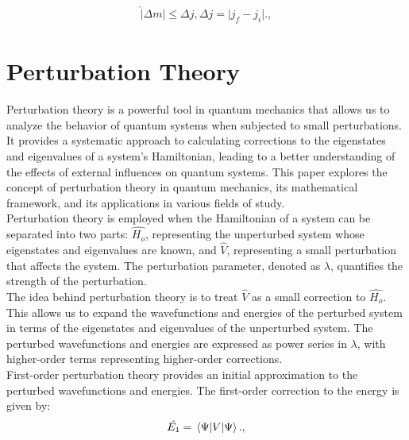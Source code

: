\documentclass[a4paper,11pt]{article}
\begin{document}
\begin{equation}
\label{eq:Selection Rules on j}
\begin{aligned}
\hat|\Delta m|\leq \Delta j, \Delta j = |j_f - j_i|.,
\end{aligned}
\end{equation}

\section{Perturbation Theory}
Perturbation theory is a powerful tool in quantum mechanics that allows us to analyze the behavior of quantum systems when subjected to small perturbations. It provides a systematic approach to calculating corrections to the eigenstates and eigenvalues of a system's Hamiltonian, leading to a better understanding of the effects of external influences on quantum systems. This paper explores the concept of perturbation theory in quantum mechanics, its mathematical framework, and its applications in various fields of study.
\\

Perturbation theory is employed when the Hamiltonian of a system can be separated into two parts: $\hat{H_o}$, representing the unperturbed system whose eigenstates and eigenvalues are known, and $\hat{V}$, representing a small perturbation that affects the system. The perturbation parameter, denoted as $\lambda$, quantifies the strength of the perturbation.
\\

The idea behind perturbation theory is to treat $\hat{V}$ as a small correction to $\hat{H_o}$. This allows us to expand the wavefunctions and energies of the perturbed system in terms of the eigenstates and eigenvalues of the unperturbed system. The perturbed wavefunctions and energies are expressed as power series in $\lambda$, with higher-order terms representing higher-order corrections.
\\

First-order perturbation theory provides an initial approximation to the perturbed wavefunctions and energies. The first-order correction to the energy is given by:
\\

\begin{equation}
\label{eq:First Order Correction to energy}
\begin{aligned}
\hat{E_1} = \expval{V}{\Psi}.,
\end{aligned}
\end{equation}
\end{document}
